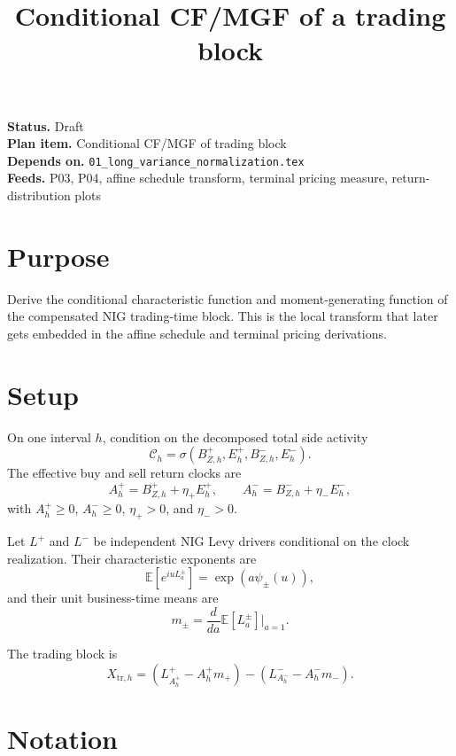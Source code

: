 \documentclass[11pt]{article}
\title{Conditional CF/MGF of a trading block}
\author{}
\date{}
\begin{document}
\maketitle

\noindent\textbf{Status.} Draft\\
\textbf{Plan item.} Conditional CF/MGF of trading block\\
\textbf{Depends on.} \texttt{01\_long\_variance\_normalization.tex}\\
\textbf{Feeds.} P03, P04, affine schedule transform, terminal pricing measure, return-distribution plots

\section{Purpose}

Derive the conditional characteristic function and moment-generating function
of the compensated NIG trading-time block.
This is the local transform that later gets embedded in the affine schedule
and terminal pricing derivations.

\section{Setup}

On one interval \(h\), condition on the decomposed total side activity
\[
    \mathcal C_h
    =
    \sigma\!\left(B_{Z,h}^+,E_h^+,B_{Z,h}^-,E_h^-\right).
\]
The effective buy and sell return clocks are
\[
    A_h^+
    =
    B_{Z,h}^+ + \eta_+E_h^+,
    \qquad
    A_h^-
    =
    B_{Z,h}^- + \eta_-E_h^-,
\]
with \(A_h^+\ge 0\), \(A_h^-\ge 0\), \(\eta_+>0\), and \(\eta_->0\).

Let \(L^+\) and \(L^-\) be independent NIG Levy drivers conditional on the
clock realization.
Their characteristic exponents are
\[
    \mathbb E\!\left[e^{iuL_a^\pm}\right]
    =
    \exp\!\left(a\psi_\pm(u)\right),
\]
and their unit business-time means are
\[
    m_\pm
    =
    \frac{d}{da}\mathbb E[L_a^\pm]\bigg|_{a=1}.
\]

The trading block is
\[
    X_{\mathrm{tr},h}
    =
    \left(L_{A_h^+}^+ - A_h^+m_+\right)
    -
    \left(L_{A_h^-}^- - A_h^-m_-\right).
\]

\section{Notation}
\end{document}

